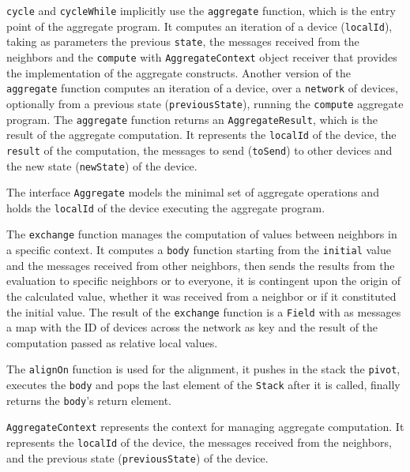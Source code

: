 \texttt{cycle} and \texttt{cycleWhile} implicitly use the \texttt{aggregate} function, which is the entry point of the aggregate program. It computes an iteration of a device (\texttt{localId}), taking as parameters the previous \texttt{state}, the messages received from the neighbors and the \texttt{compute} with \texttt{AggregateContext} object receiver that provides the implementation of the aggregate constructs. Another version of the \texttt{aggregate} function computes an iteration of a device, over a \texttt{network} of devices, optionally from a previous state (\texttt{previousState}), running the \texttt{compute} aggregate program. The \texttt{aggregate} function returns an \texttt{AggregateResult}, which is the result of the aggregate computation. It represents the \texttt{localId} of the device, the \texttt{result} of the computation, the messages to send (\texttt{toSend}) to other devices and the new state (\texttt{newState}) of the device.

The interface \texttt{Aggregate} models the minimal set of aggregate operations and holds the \texttt{localId} of the device executing the aggregate program.

The \texttt{exchange} function manages the computation of values between neighbors in a specific context. It computes a \texttt{body} function starting from the \texttt{initial} value and the messages received from other neighbors, then sends the results from the evaluation to specific neighbors or to everyone, it is contingent upon the origin of the calculated value, whether it was received from a neighbor or if it constituted the initial value. The result of the \texttt{exchange} function is a \texttt{Field} with as messages a map with the ID of devices across the network as key and the result of the computation passed as relative local values.

The \texttt{alignOn} function is used for the alignment, it pushes in the stack the \texttt{pivot}, executes the \texttt{body} and pops the last element of the \texttt{Stack} after it is called, finally returns the \texttt{body}'s return element.

\texttt{AggregateContext} represents the context for managing aggregate computation. It represents the \texttt{localId} of the device, the messages received from the neighbors, and the previous state (\texttt{previousState}) of the device.

